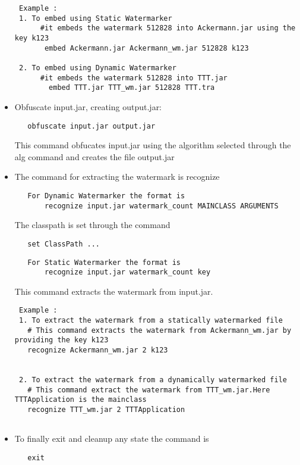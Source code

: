 \begin{itemize}
\begin{verbatim}
 Example :
 1. To embed using Static Watermarker
      #it embeds the watermark 512828 into Ackermann.jar using the key k123
       embed Ackermann.jar Ackermann_wm.jar 512828 k123
   
 2. To embed using Dynamic Watermarker
      #it embeds the watermark 512828 into TTT.jar 
        embed TTT.jar TTT_wm.jar 512828 TTT.tra
\end{verbatim}

  \item Obfuscate input.jar, creating output.jar:
\begin{verbatim}
   obfuscate input.jar output.jar 
\end{verbatim}
    This command obfucates input.jar using the algorithm selected through the alg command
    and creates the file output.jar
    
  \item  The command for extracting the watermark is recognize 
\begin{verbatim}
   For Dynamic Watermarker the format is
	   recognize input.jar watermark_count MAINCLASS ARGUMENTS
\end{verbatim}
     The classpath is set through the command
\begin{verbatim}
   set ClassPath ...
\end{verbatim}
\begin{verbatim}
   For Static Watermarker the format is
	   recognize input.jar watermark_count key
\end{verbatim}
   This command extracts the watermark from input.jar.
\begin{verbatim}
 Example :
 1. To extract the watermark from a statically watermarked file
   # This command extracts the watermark from Ackermann_wm.jar by providing the key k123
   recognize Ackermann_wm.jar 2 k123
	
   
 2. To extract the watermark from a dynamically watermarked file
   # This command extract the watermark from TTT_wm.jar.Here TTTApplication is the mainclass
   recognize TTT_wm.jar 2 TTTApplication
   
\end{verbatim}

\item To finally exit and cleanup any state the command is 
\begin{verbatim}
   exit
\end{verbatim}   
   

\end{itemize}
